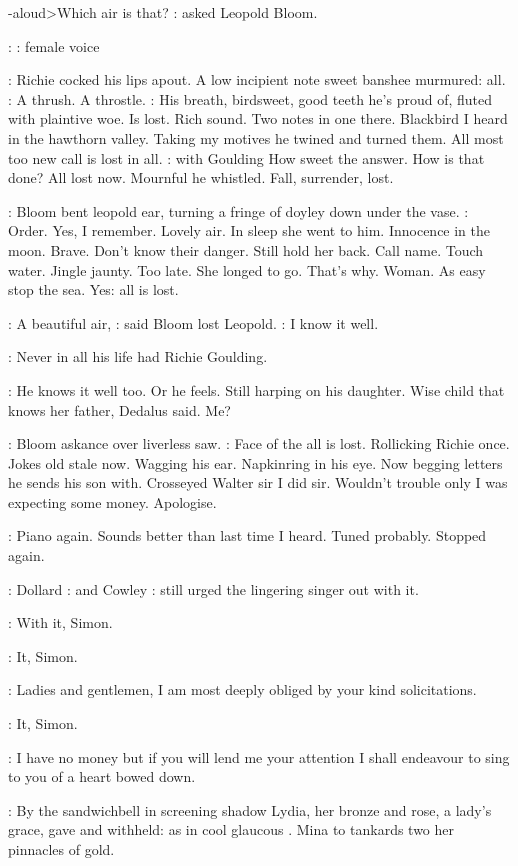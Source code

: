 \bloom-aloud>Which air is that?
:
asked Leopold Bloom.

\Song:
\Stage:
female voice

:
Richie cocked his lips apout.
A low incipient note sweet banshee murmured:
all.
\Goulding:
A thrush. A throstle.
\BloomInt:
His breath, birdsweet, good teeth he's
proud of, fluted with plaintive woe. Is lost. Rich sound. Two notes in one
there. Blackbird I heard in the hawthorn valley. Taking my motives he
twined and turned them. All most too new call is lost in all.
\Stage:
with Goulding
How sweet the answer. How is that done? All lost now. Mournful he whistled.
Fall, surrender, lost.

:
Bloom bent leopold ear, turning a fringe of doyley down under the
vase.
\BloomInt:
Order. Yes, I remember. Lovely air. In sleep she went to him.
Innocence in the moon. Brave. Don't know their danger. Still hold her
back. Call name.
Touch water. Jingle jaunty. Too late. She longed to go.
That's why. Woman. As easy stop the sea. Yes: all is lost.

\Bloom:
A beautiful air,
:
said Bloom lost Leopold.
\Bloom:
I know it well.

:
Never in all his life had Richie Goulding.

\BloomInt:
He knows it well too. Or he feels. Still harping on his daughter. Wise
child that knows her father, Dedalus said. Me?

:
Bloom askance over liverless saw.
\BloomInt:
Face of the all is lost. Rollicking
Richie once. Jokes old stale now. Wagging his ear. Napkinring in his eye.
Now begging letters he sends his son with. Crosseyed Walter sir I did sir.
Wouldn't trouble only I was expecting some money. Apologise.

\BloomInt:
Piano again.
Sounds better than last time I heard. Tuned probably.
Stopped again.

:
Dollard
:
and Cowley
:
still urged the lingering singer out with it.

\Dollard:
With it, Simon.

\Cowley:
It, Simon.

\Simon:
Ladies and gentlemen, I am most deeply obliged by your kind
solicitations.

\Cowley:
It, Simon.

\Simon:
I have no money but if you will lend me your attention I shall endeavour
to sing to you of a heart bowed down.

:
By the sandwichbell
in screening shadow Lydia, her bronze and rose,
a lady's grace, gave and withheld: as in cool glaucous
.
Mina to tankards two her pinnacles of gold.

